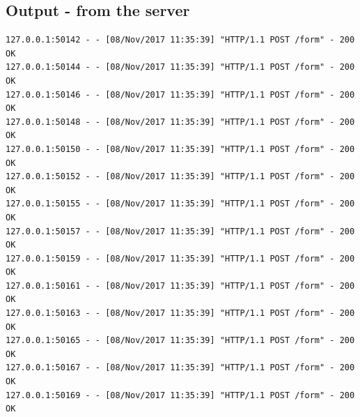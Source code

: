 \documentclass{WeSTassignment}
\begin{document}
\subsection*{Output - from the server}
\begin{verbatim}
127.0.0.1:50142 - - [08/Nov/2017 11:35:39] "HTTP/1.1 POST /form" - 200 OK
127.0.0.1:50144 - - [08/Nov/2017 11:35:39] "HTTP/1.1 POST /form" - 200 OK
127.0.0.1:50146 - - [08/Nov/2017 11:35:39] "HTTP/1.1 POST /form" - 200 OK
127.0.0.1:50148 - - [08/Nov/2017 11:35:39] "HTTP/1.1 POST /form" - 200 OK
127.0.0.1:50150 - - [08/Nov/2017 11:35:39] "HTTP/1.1 POST /form" - 200 OK
127.0.0.1:50152 - - [08/Nov/2017 11:35:39] "HTTP/1.1 POST /form" - 200 OK
127.0.0.1:50155 - - [08/Nov/2017 11:35:39] "HTTP/1.1 POST /form" - 200 OK
127.0.0.1:50157 - - [08/Nov/2017 11:35:39] "HTTP/1.1 POST /form" - 200 OK
127.0.0.1:50159 - - [08/Nov/2017 11:35:39] "HTTP/1.1 POST /form" - 200 OK
127.0.0.1:50161 - - [08/Nov/2017 11:35:39] "HTTP/1.1 POST /form" - 200 OK
127.0.0.1:50163 - - [08/Nov/2017 11:35:39] "HTTP/1.1 POST /form" - 200 OK
127.0.0.1:50165 - - [08/Nov/2017 11:35:39] "HTTP/1.1 POST /form" - 200 OK
127.0.0.1:50167 - - [08/Nov/2017 11:35:39] "HTTP/1.1 POST /form" - 200 OK
127.0.0.1:50169 - - [08/Nov/2017 11:35:39] "HTTP/1.1 POST /form" - 200 OK
\end{verbatim}

\makefooter
\end{document}
